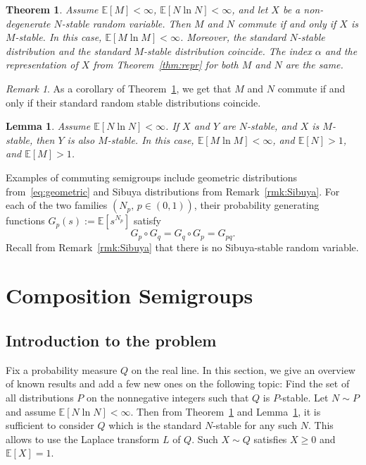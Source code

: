 \documentclass[12pt]{amsart}
\newtheorem{theorem}{Theorem}[section]
\newtheorem{lemma}{Lemma}[section]
\theoremstyle{remark}
\newtheorem{remark}{Remark}[section]
\theoremstyle{definition}
\begin{document}
\begin{theorem} Assume $\mathbb E[M] < \infty$, $\mathbb E[N\ln N] < \infty$, and let $X$ be a non-degenerate $N$-stable random variable. Then $M$ and $N$ commute if and only if $X$ is $M$-stable. In this case, $\mathbb E[M\ln M] < \infty$. Moreover, the  standard $N$-stable distribution and the standard $M$-stable distribution coincide.  The index $\alpha$ and the representation of $X$ from Theorem~\ref{thm:repr} for both $M$ and $N$ are the same. 
\label{thm:commute}
\end{theorem}

\begin{remark}
As a corollary of Theorem~\ref{thm:commute}, we get that $M$ and $N$ commute if and only if their standard random stable distributions coincide. 
\end{remark}

\begin{lemma}
\label{lemma:curious}
Assume $\mathbb E[N\ln N] < \infty$. If $X$ and $Y$ are $N$-stable, and $X$ is $M$-stable, then $Y$ is also $M$-stable. In this case, $\mathbb E[M\ln M] < \infty$, and $\mathbb E[N] > 1$, and $\mathbb E[M] > 1$. 
\end{lemma}

Examples of  commuting semigroups include geometric distributions from~\eqref{eq:geometric} and Sibuya distributions from Remark~\ref{rmk:Sibuya}. For each of the two families $(N_p,\, p \in (0, 1))$, their probability generating functions $G_p(s) := \mathbb E[s^{N_p}]$ satisfy 
\begin{equation}
\label{eq:semigroup-property}
G_p\circ G_q = G_q\circ G_p = G_{pq}.
\end{equation}
Recall from Remark~\ref{rmk:Sibuya} that there is no Sibuya-stable random variable.

\section{Composition Semigroups} 
\label{sec:semigroup}

\subsection{Introduction to the problem} Fix a probability measure $Q$ on the real line. In this section, we give an overview of known results and add a few new ones on the following topic: Find the set of all distributions $P$ on the nonnegative integers such that $Q$ is $P$-stable. Let $N \sim P$ and assume $\mathbb E[N \ln N] < \infty$. Then 
from Theorem~\ref{thm:commute} and Lemma~\ref{lemma:curious}, it is sufficient to consider $Q$ which is the standard $N$-stable for any such $N$. This allows to use the Laplace transform $L$ of $Q$. Such $X \sim Q$ satisfies $X \ge 0$ and $\mathbb E[X] = 1$. 
\end{document}
